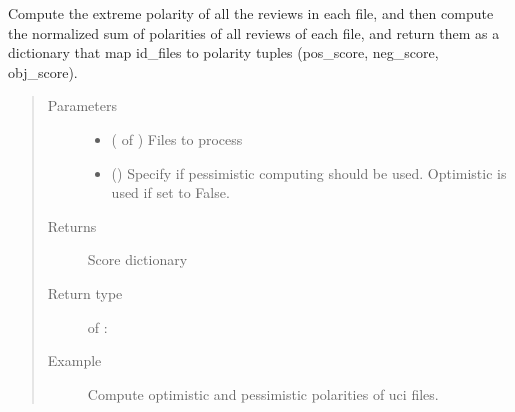 \documentclass[letterpaper,10pt,english]{sphinxmanual}
\begin{document}
\begin{fulllineitems}
\label{\detokenize{analysis:loacore.analysis.sentiment_analysis.compute_extreme_files_polarity}}
Compute the extreme polarity of all the reviews in each file, and then compute the normalized sum of polarities of
all reviews of each file, and return them as a dictionary that map id\_files to polarity tuples (pos\_score,
neg\_score, obj\_score).
\begin{quote}\begin{description}
\item[{Parameters}] \leavevmode\begin{itemize}
\item {} 
 ( of ) \textendash{} Files to process

\item {} 
 () \textendash{} Specify if pessimistic computing should be used. Optimistic is used if set to False.

\end{itemize}

\item[{Returns}] \leavevmode
Score dictionary

\item[{Return type}] \leavevmode
{} of  : 

\item[{Example}] \leavevmode
Compute optimistic and pessimistic polarities of uci files.


\end{description}
\end{quote}
\end{fulllineitems}
\end{document}
